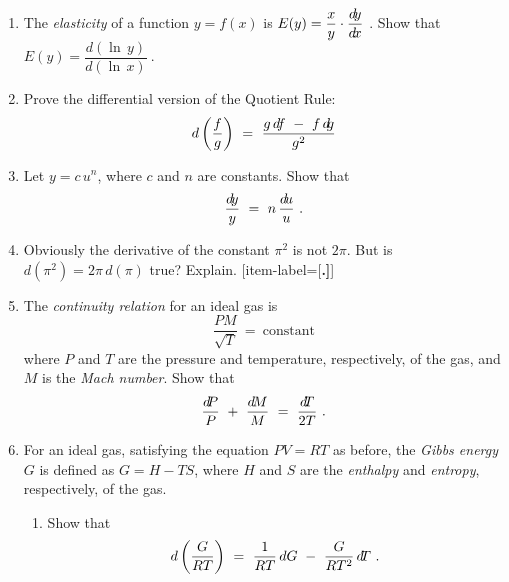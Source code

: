 \startexercises\label{sec3dot6}
{\small
{}
\begin{enumerate}[item-label={\bfseries \arabic*.}]
 \item The \emph{elasticity} of a function $y = f(x)$ is
 $E(y) = \dfrac{x}{y} \cdot \dfrac{d\!y}{d\!x}~$. Show that $E(y) = \dfrac{d(\ln\,y)}{d(\ln\,x)}~$.
 \item Prove the differential version of the Quotient Rule:
 \[
  d\left(\dfrac{f}{g}\right) ~=~ \dfrac{g\,d\negmedspace f ~-~ f\,d\negmedspace g}{g^2}
 \]
\newpage
 \item Let $y = c\,u^n$, where $c$ and $n$ are constants. Show that
 \[
  \frac{d\!y}{y} ~=~ n\,\frac{d\!u}{u} ~.
 \]
 \item Obviously the derivative of the constant $\pi^2$ is not $2\pi$. But is
  $d(\pi^2) = 2\pi\,d(\pi)$ true? Explain.
[item-label={{[\bfseries \arabic*.]}}]
 \item The \emph{continuity relation} for an ideal gas is
 \[
 \frac{PM}{\sqrt{T}} ~=~ \text{constant}
 \]
 where $P$ and $T$ are the pressure and temperature, respectively, of the gas,
 and $M$ is the \emph{Mach number}. Show that
 \[
 \frac{d\negmedspace P}{P} ~+~ \frac{d\!M}{M} ~=~ \frac{d\negmedspace T}{2T} ~.
 \]
 \item For an ideal gas, satisfying the equation $PV = RT$ as before, the \emph{Gibbs
  energy} $G$ is defined as $G = H - TS$, where $H$ and $S$ are
  the \emph{enthalpy} and \emph{entropy}, respectively, of the gas.
  \begin{enumerate}[item-label={\bfseries (\alph*)}]
   \item Show that
   \begin{displaymath}
    d\left(\dfrac{G}{RT}\right) ~=~ \dfrac{1}{RT}\,dG ~-~ \dfrac{G}{RT^2}\,d\negmedspace T ~.
   \end{displaymath}

\end{enumerate}
\end{enumerate}}
